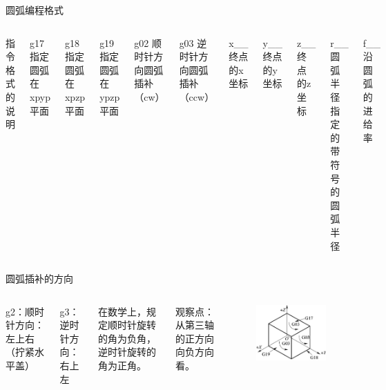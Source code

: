 \documentclass[utf8,zihao=-4]{ctexbeamer}
\begin{document}
\begin{frame}{圆弧编程格式}
    \begin{columns}
        
      指令格式的说明
      
      g17	指定圆弧在xpyp平面
      
      g18	指定圆弧在xpzp平面
      
      g19	指定圆弧在ypzp平面
      
      g02	顺时针方向圆弧插补（cw）
      
      g03	逆时针方向圆弧插补（ccw）
      
      x\_\_	终点的x坐标
      
      y\_\_	终点的y坐标
      
      z\_\_	终点的z坐标
      
      r\_\_	圆弧半径指定的带符号的圆弧半径
      
      f\_\_	沿圆弧的进给率           
        
    \end{columns}
\end{frame}



\begin{frame}{圆弧插补的方向}
    \begin{columns}

g2：顺时针方向：左上右 （拧紧水平盖）

g3：逆时针方向：右上左

在数学上，规定顺时针旋转的角为负角，逆时针旋转的角为正角。


观察点：从第三轴的正方向向负方向看。


        
        \begin{figure}
            \centering
            \includegraphics[width=\linewidth]{image/4-2}
            \caption{}
            \label{fig:4-2}
        \end{figure}
        
\end{columns}
\end{frame}
\end{document}
